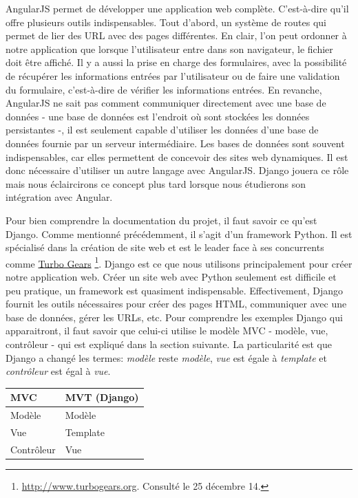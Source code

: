 \documentclass[a4paper,10pt,twoside]{sphinxmanual}
\begin{document}
AngularJS permet de développer une application web complète. C'est-à-dire qu'il offre plusieurs outils indispensables. Tout d'abord, un système de routes qui permet de lier des URL avec des pages différentes. En clair, l'on peut ordonner à notre application que lorsque l'utilisateur entre  dans son navigateur, le fichier  doit être affiché. Il y a aussi la prise en charge des formulaires, avec la possibilité de récupérer les informations entrées par l'utilisateur ou de faire une validation du formulaire, c'est-à-dire de vérifier les informations entrées. En revanche, AngularJS ne sait pas comment communiquer directement avec une base de données - une base de données est l'endroit où sont stockées les données persistantes -, il est seulement capable d'utiliser les données d'une base de données fournie par un serveur intermédiaire. Les bases de données sont souvent indispensables, car elles permettent de concevoir des sites web dynamiques. Il est donc nécessaire d'utiliser un autre langage avec AngularJS. Django jouera ce rôle mais nous éclaircirons ce concept plus tard lorsque nous étudierons son intégration avec Angular.

Pour bien comprendre la documentation du projet, il faut savoir ce qu'est Django. Comme mentionné précédemment, il s'agit d'un framework Python. Il est spécialisé dans la création de site web et est le leader face à ses concurrents comme \href{http://www.turbogears.org/}{Turbo Gears} \footnote{
\href{http://www.turbogears.org}{http://www.turbogears.org}. Consulté le 25 décembre 14.
}. Django est ce que nous utilisons principalement pour créer notre application web. Créer un site web avec Python seulement est difficile et peu pratique, un framework est  quasiment indispensable. Effectivement, Django fournit les outils nécessaires pour créer des pages HTML, communiquer avec une base de données, gérer les URLs, etc. Pour comprendre les exemples Django qui apparaitront, il faut savoir que celui-ci utilise le modèle MVC - modèle, vue, contrôleur - qui est expliqué dans la section suivante. La particularité est que Django a changé les termes: \emph{modèle} reste \emph{modèle}, \emph{vue} est égale à \emph{template} et \emph{contrôleur} est égal à \emph{vue}.

\begin{tabulary}{\linewidth}{|L|L|}
\hline
\textsf{\relax 
MVC
} & \textsf{\relax 
MVT (Django)
}\\
\hline
Modèle
 & 
Modèle
\\

Vue
 & 
Template
\\

Contrôleur
 & 
Vue
\\
\hline\end{tabulary}
\end{document}
